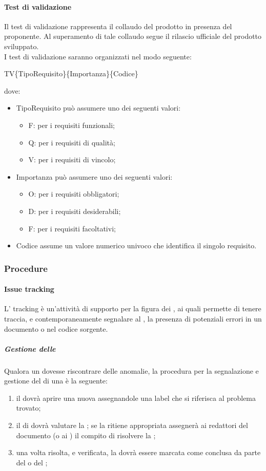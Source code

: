 \paragraph{Test di validazione}
Il test di validazione rappresenta il collaudo del prodotto in presenza del proponente. Al
superamento di tale collaudo segue il rilascio ufficiale del prodotto sviluppato.\\
I test di validazione saranno organizzati nel modo seguente: \\
\begin{center} TV\{TipoRequisito\}\{Importanza\}\{Codice\} \end{center}
dove:
\begin{itemize}
	\item TipoRequisito può assumere uno dei seguenti valori:
	\begin{itemize}
		\item F: per i requisiti funzionali;
		\item Q: per i requisiti di qualità;
		\item V: per i requisiti di vincolo;
	\end{itemize}
	\item Importanza può assumere uno dei seguenti valori:
	\begin{itemize}
		\item O: per i requisiti obbligatori;
		\item D: per i requisiti desiderabili;
		\item F: per i requisiti facoltativi;
	\end{itemize}
	\item Codice assume un valore numerico univoco che identifica il singolo requisito.
\end{itemize}

\subsubsection{Procedure}
\paragraph{Issue tracking}
L' tracking è un'attività di supporto per la figura dei \VERP, ai quali permette di tenere traccia, e contemporaneamente segnalare al \RESP, la presenza di potenziali errori in un documento o nel codice sorgente.
 \subparagraph{Gestione delle }
Qualora un \VER{} dovesse riscontrare delle anomalie, la procedura per la segnalazione e gestione del  di una  è la seguente:
\begin{enumerate}
	\item il \VER{} dovrà aprire una nuova  assegnandole una label che si riferisca al problema trovato;
	\item il \RESP{} di  dovrà valutare la ; se la ritiene appropriata assegnerà ai redattori del documento (o ai \PRP) il compito di risolvere la ;
	\item una volta risolta, e verificata, la  dovrà essere marcata come conclusa da parte del \RESP{} o del \VER;
\end{enumerate}
